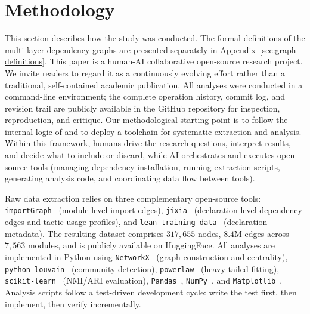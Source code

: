\section{Methodology}
\label{sec:methodology}

This section describes how the study was conducted. The formal definitions of the multi-layer dependency graphs are presented separately in Appendix~\ref{sec:graph-definitions}. \label{sec:workflow} This paper is a human-AI collaborative open-source research project. We invite readers to regard it as a continuously evolving effort rather than a traditional, self-contained academic publication. All analyses were conducted in a command-line environment; the complete operation history, commit log, and revision trail are publicly available in the GitHub repository for inspection, reproduction, and critique. %
Our methodological starting point is to follow the internal logic of  and to deploy a toolchain for systematic extraction and analysis. Within this framework, humans drive the research questions, interpret results, and decide what to include or discard, while AI orchestrates and executes open-source tools (managing dependency installation, running extraction scripts, generating analysis code, and coordinating data flow between tools).

Raw data extraction relies on three complementary open-source tools: \texttt{importGraph}~\cite{importgraph} (module-level import edges), \texttt{jixia}~\cite{jixia2024} (declaration-level dependency edges and tactic usage profiles), and \texttt{lean-training-data}~\cite{lean_training_data} (declaration metadata). The resulting dataset comprises $317{,}655$ nodes, $8.4$M edges across $7{,}563$ modules, and is publicly available on HuggingFace. All analyses are implemented in Python using \texttt{NetworkX}~\cite{hagberg2008} (graph construction and centrality), \texttt{python-louvain}~\cite{aynaud2020} (community detection), \texttt{powerlaw}~\cite{alstott2014} (heavy-tailed fitting), \texttt{scikit-learn}~\cite{pedregosa2011} (NMI/ARI evaluation), \texttt{Pandas}~\cite{mckinney2010}, \texttt{NumPy}~\cite{harris2020}, and \texttt{Matplotlib}~\cite{hunter2007}. Analysis scripts follow a test-driven development cycle: write the test first, then implement, then verify incrementally.
 